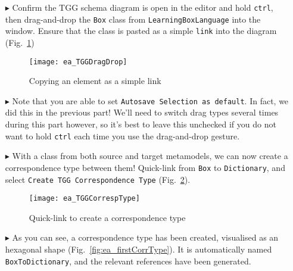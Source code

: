 \begin{itemize}

\item[$\blacktriangleright$] Confirm the TGG schema diagram is open in the editor and hold \texttt{ctrl}, then drag-and-drop the \texttt{Box} class from
\texttt{Learning\-Box\-Language} into the window. Ensure that the class is pasted as a simple \texttt{link} into the diagram
(Fig.~\ref{fig:TGGdragDrop})

\vspace{0.5cm}

\begin{figure}[htbp]
\begin{center}
  \texttt{[image: ea\_TGGDragDrop]}
  \caption{Copying an element as a simple link} 
  \label{fig:TGGdragDrop}
\end{center}
\end{figure}

\item[$\blacktriangleright$] Note that you are able to set \texttt{Autosave Selection as default}. In fact, we did this in the previous part! We'll need to
switch drag types several times during this part however, so it's best to leave this unchecked if you do not want to hold \texttt{ctrl} each time you use the
drag-and-drop gesture.

\vspace{0.5cm}

\item[$\blacktriangleright$] With a class from both source and target metamodels, we can now create a correspondence type between them! Quick-link from
\texttt{Box} to \texttt{Dictionary}, and select \texttt{Create TGG Corres\-pon\-dence Type} (Fig.~\ref{fig:create_correspondence}).

\newpage

\begin{figure}[htbp]
\begin{center}
  \texttt{[image: ea\_TGGCorrespType]}
  \caption{Quick-link to create a correspondence type} 
  \label{fig:create_correspondence}
\end{center}
\end{figure}

\item[$\blacktriangleright$] As you can see, a correspondence type has been created, visualised as an hexagonal shape (Fig.~\ref{fig:ea_firstCorrType}). It is
automatically named \texttt{BoxToDiction\-ary}, and the relevant references have been generated.


\end{itemize}
